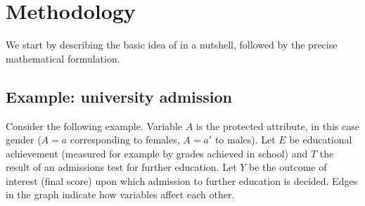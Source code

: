 \documentclass[
  notitle]{jss}
\begin{document}
\hypertarget{methodology}{%
\section{Methodology}\label{methodology}}

\label{Method}

We start by describing the basic idea of  in a nutshell,
followed by the precise mathematical formulation.

\hypertarget{example-university-admission}{%
\subsection{Example: university
admission}\label{example-university-admission}}

Consider the following example. Variable \(A\) is the protected
attribute, in this case gender (\(A = a\) corresponding to females,
\(A = a'\) to males). Let \(E\) be educational achievement (measured for
example by grades achieved in school) and \(T\) the result of an
admissions test for further education. Let \(Y\) be the outcome of
interest (final score) upon which admission to further education is
decided. Edges in the graph indicate how variables affect each other.

\begin{center}
\end{center}
\end{document}
